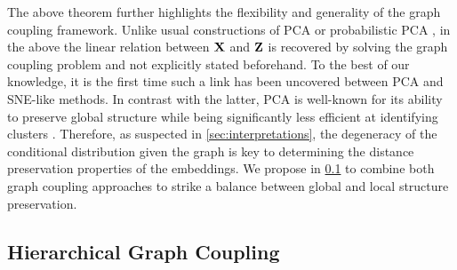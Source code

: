The above theorem further highlights the flexibility and generality of the graph coupling framework. Unlike usual constructions of PCA or probabilistic PCA \citep{tipping1999probabilistic}, in the above the linear relation between $\mathbf{X}$ and $\mathbf{Z}$ is recovered by solving the graph coupling problem and not explicitly stated beforehand. To the best of our knowledge, it is the first time such a link has been uncovered between PCA and SNE-like methods. In contrast with the latter, PCA is well-known for its ability to preserve global structure while being significantly less efficient at identifying clusters \citep{anowar2021conceptual}. Therefore, as suspected in \cref{sec:interpretations}, the degeneracy of the conditional distribution given the graph is key to determining the distance preservation properties of the embeddings. We propose in \cref{sec:hierarchical_modelling} to combine both graph coupling approaches to strike a balance between global and local structure preservation.

\subsection{Hierarchical Graph Coupling}\label{sec:hierarchical_modelling}

